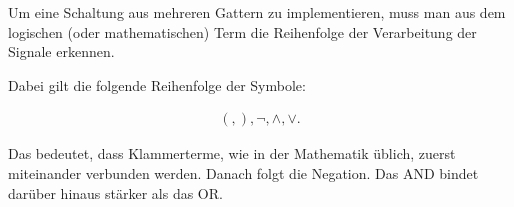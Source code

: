 Um eine Schaltung aus mehreren Gattern zu implementieren, muss man aus dem logischen (oder mathematischen) Term die Reihenfolge der Verarbeitung der Signale erkennen.

Dabei gilt die folgende Reihenfolge der Symbole:

\begin{align*}
(,), \neg, \wedge, \vee.
\end{align*}

Das bedeutet, dass Klammerterme, wie in der Mathematik üblich, zuerst miteinander verbunden werden.
Danach folgt die Negation.
Das AND bindet darüber hinaus stärker als das OR.